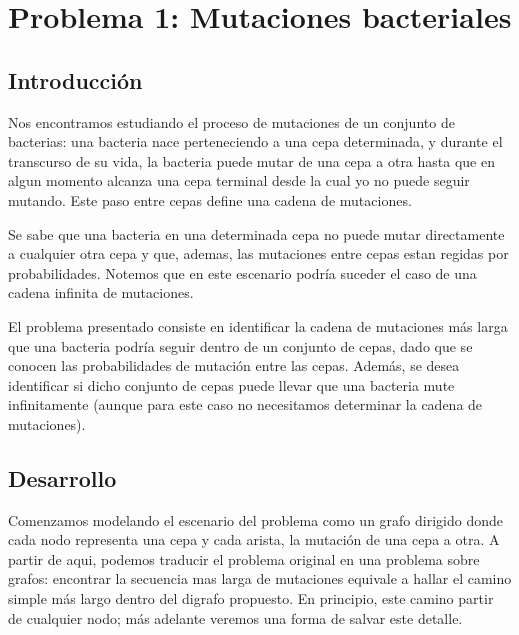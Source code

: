 \section{Problema 1: Mutaciones bacteriales}
 
\subsection{Introducci\'on}

Nos encontramos estudiando el proceso de mutaciones de un conjunto de bacterias:
una bacteria nace perteneciendo a una cepa determinada, y
durante el transcurso de su vida, la bacteria puede mutar de una cepa a otra hasta que en
algun momento alcanza una cepa terminal desde la cual yo no puede seguir mutando. 
Este paso entre cepas define una cadena de mutaciones.

Se sabe que una bacteria en una determinada cepa no puede mutar directamente a cualquier otra cepa y que, ademas, las mutaciones entre cepas estan regidas por probabilidades.
Notemos que en este escenario podr\'ia suceder el caso de una cadena infinita de mutaciones.

El problema presentado consiste en identificar la cadena de mutaciones m\'as larga que una bacteria podr\'ia seguir dentro de un conjunto de cepas, dado que se conocen las probabilidades de mutaci\'on entre las cepas. Adem\'as, se desea identificar si dicho conjunto de cepas puede llevar que una bacteria mute infinitamente (aunque para este caso no necesitamos determinar la cadena de mutaciones).


\subsection{Desarrollo}


Comenzamos modelando el escenario del problema como un grafo dirigido donde cada nodo representa una cepa y cada arista, la mutación de una cepa a otra.
A partir de aqui, podemos traducir el problema original en una problema sobre grafos: encontrar la secuencia mas larga de mutaciones equivale a hallar el camino simple m\'as largo dentro del digrafo propuesto. En principio, este camino partir de cualquier nodo; más adelante veremos una forma de salvar este detalle.

